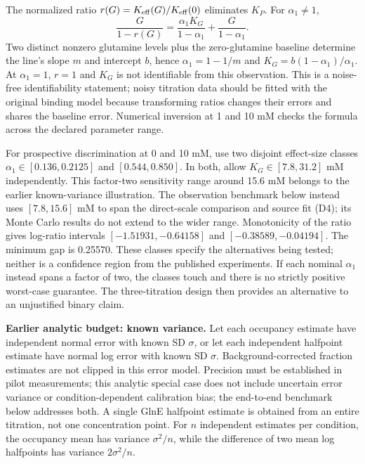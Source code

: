 \documentclass[11pt]{article}
\begin{document}
The normalized ratio $r(G)=K_{\rm eff}(G)/K_{\rm eff}(0)$ eliminates $K_P$. For $\alpha_1\ne1$,
\[
 \frac{G}{1-r(G)}=\frac{\alpha_1K_G}{1-\alpha_1}+\frac{G}{1-\alpha_1}.
\]
Two distinct nonzero glutamine levels plus the zero-glutamine baseline determine the line's slope $m$ and intercept $b$, hence $\alpha_1=1-1/m$ and $K_G=b(1-\alpha_1)/\alpha_1$. At $\alpha_1=1$, $r=1$ and $K_G$ is not identifiable from this observation. This is a noise-free identifiability statement; noisy titration data should be fitted with the original binding model because transforming ratios changes their errors and shares the baseline error. Numerical inversion at 1 and 10 mM checks the formula across the declared parameter range.

For prospective discrimination at 0 and 10 mM, use two disjoint effect-size classes $\alpha_1\in[0.136,0.2125]$ and $[0.544,0.850]$. In both, allow $K_G\in[7.8,31.2]$ mM independently. This factor-two sensitivity range around 15.6 mM belongs to the earlier known-variance illustration. The observation benchmark below instead uses $[7.8,15.6]$ mM to span the direct-scale comparison and source fit (D4); its Monte Carlo results do not extend to the wider range. Monotonicity of the ratio gives log-ratio intervals $[-1.51931,-0.64158]$ and $[-0.38589,-0.04194]$. The minimum gap is 0.25570. These classes specify the alternatives being tested; neither is a confidence region from the published experiments. If each nominal $\alpha_1$ instead spans a factor of two, the classes touch and there is no strictly positive worst-case guarantee. The three-titration design then provides an alternative to an unjustified binary claim.

\textbf{Earlier analytic budget: known variance.} Let each occupancy estimate have independent normal error with known SD $\sigma$, or let each independent halfpoint estimate have normal log error with known SD $\sigma$. Background-corrected fraction estimates are not clipped in this error model. Precision must be established in pilot measurements; this analytic special case does not include uncertain error variance or condition-dependent calibration bias; the end-to-end benchmark below addresses both. A single GlnE halfpoint estimate is obtained from an entire titration, not one concentration point. For $n$ independent estimates per condition, the occupancy mean has variance $\sigma^2/n$, while the difference of two mean log halfpoints has variance $2\sigma^2/n$.
\end{document}
